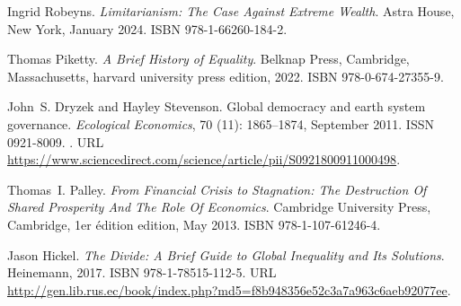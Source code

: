 \documentclass[12pt,english]{article}
\begin{document}
\begin{thebibliography}{55}
  Ingrid Robeyns.
  \newblock \emph{{Limitarianism: The Case Against Extreme Wealth}}.
  \newblock Astra House, New York, January 2024.
  \newblock ISBN 978-1-66260-184-2.
  
  Thomas Piketty.
  \newblock \emph{A {{Brief History}} of {{Equality}}}.
  \newblock Belknap Press, Cambridge, Massachusetts, harvard university press
    edition, 2022.
  \newblock ISBN 978-0-674-27355-9.
  
  John~S. Dryzek and Hayley Stevenson.
  \newblock Global democracy and earth system governance.
  \newblock \emph{Ecological Economics}, 70 (11): 1865--1874,
    September 2011.
  \newblock ISSN 0921-8009.
  \newblock {}.
  \newblock URL
    \url{https://www.sciencedirect.com/science/article/pii/S0921800911000498}.
  
  Thomas~I. Palley.
  \newblock \emph{{From Financial Crisis to Stagnation: The Destruction Of Shared
    Prosperity And The Role Of Economics}}.
  \newblock Cambridge University Press, Cambridge, 1er {\'e}dition edition, May
    2013.
  \newblock ISBN 978-1-107-61246-4.
  
  Jason Hickel.
  \newblock \emph{The {{Divide}}: {{A Brief Guide}} to {{Global Inequality}} and
    Its {{Solutions}}}.
  \newblock Heinemann, 2017.
  \newblock ISBN 978-1-78515-112-5.
  \newblock URL
    \url{http://gen.lib.rus.ec/book/index.php?md5=f8b948356e52c3a7a963c6aeb92077ee}.
  
  \end{thebibliography}

  

\appendix %
\renewcommand{\thetable}{ED\arabic{table}}
\renewcommand{\thefigure}{ED\arabic{figure}}
\setcounter{figure}{0}
\setcounter{table}{0}

\clearpage

%       
\end{document}
